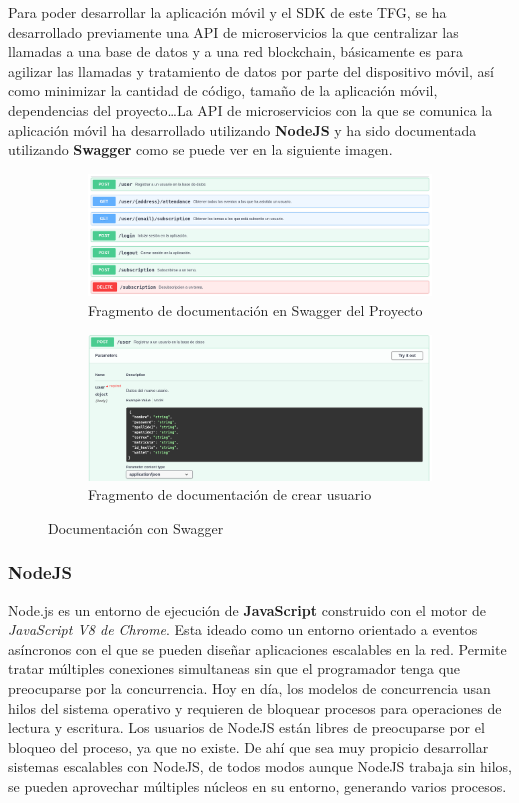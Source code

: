 Para poder desarrollar la aplicación móvil y el SDK de este TFG, se ha desarrollado previamente una API de microservicios la que centralizar las llamadas a una base de datos y a una red blockchain, básicamente es para agilizar las llamadas y tratamiento de datos por parte del dispositivo móvil, así como minimizar la cantidad de código, tamaño de la aplicación móvil, dependencias del proyecto\dots La API de microservicios con la que se comunica la aplicación móvil ha desarrollado utilizando \textbf{NodeJS} y ha sido documentada utilizando \textbf{Swagger} como se puede ver en la siguiente imagen. \\

\begin{figure}[hbt]
	\centering
	\begin{subfigure}[b]{0.6\linewidth}
		\centering
        \includegraphics[width=0.6\linewidth]{figs/Desarrollo/Swagger}
        \caption[Swagger]{Fragmento de documentación en Swagger del Proyecto}
	\end{subfigure} 
	\begin{subfigure}[b]{0.6\linewidth}
		\centering
        \includegraphics[width=0.6\linewidth]{figs/Desarrollo/SwaggerUsuario}
        \caption[Swagger Usuario]{Fragmento de documentación de crear usuario}
	\end{subfigure} 
	\caption[Swagger]{Documentación con Swagger}
	\label{fig:programas}
\end{figure}

\subsubsection{NodeJS}
Node.js\cite{nodejs} es un entorno de ejecución de \textbf{JavaScript} construido con el motor de \emph{JavaScript V8 de Chrome}. Esta ideado como un entorno orientado a eventos asíncronos con el que se pueden diseñar aplicaciones escalables en la red. Permite tratar múltiples conexiones simultaneas sin que el programador tenga que preocuparse por la concurrencia. Hoy en día, los modelos de concurrencia usan hilos del sistema operativo y requieren de bloquear procesos para operaciones de lectura y escritura. Los usuarios de NodeJS están libres de preocuparse por el bloqueo del proceso, ya que no existe. De ahí que sea muy propicio desarrollar sistemas escalables con NodeJS, de todos modos aunque NodeJS trabaja sin hilos, se pueden aprovechar múltiples núcleos en su entorno, generando varios procesos. \\

